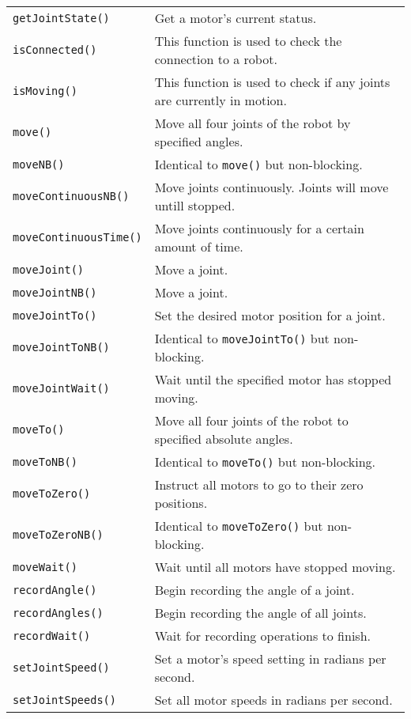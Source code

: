 \begin{table}[!h]
\begin{center}
\begin{tabular}{p{38 mm}p{110 mm}}
\texttt{getJointState()} & Get a motor's current status. \\
\texttt{isConnected()} & This function is used to check the connection to a robot. \\
\texttt{isMoving()} & This function is used to check if any joints are currently in motion. \\
\texttt{move()} & Move all four joints of the robot by specified angles. \\
\texttt{moveNB()} & Identical to \texttt{move()} but non-blocking. \\
\texttt{moveContinuousNB()} & Move joints continuously. Joints will move untill stopped.\\
\texttt{moveContinuousTime()} & Move joints continuously for a certain amount of time.\\
\texttt{moveJoint()} & Move a joint. \\
\texttt{moveJointNB()} & Move a joint. \\
\texttt{moveJointTo()} & Set the desired motor position for a joint. \\
\texttt{moveJointToNB()} & Identical to \texttt{moveJointTo()} but non-blocking. \\
\texttt{moveJointWait()} & Wait until the specified motor has stopped moving. \\
\texttt{moveTo()} & Move all four joints of the robot to specified absolute angles. \\
\texttt{moveToNB()} & Identical to \texttt{moveTo()} but non-blocking. \\
\texttt{moveToZero()} & Instruct all motors to go to their zero positions. \\
\texttt{moveToZeroNB()} & Identical to \texttt{moveToZero()} but non-blocking. \\
\texttt{moveWait()} & Wait until all motors have stopped moving. \\
\texttt{recordAngle()} & Begin recording the angle of a joint. \\
\texttt{recordAngles()} & Begin recording the angle of all joints. \\
\texttt{recordWait()} & Wait for recording operations to finish. \\
\texttt{setJointSpeed()} & Set a motor's speed setting in radians per second. \\
\texttt{setJointSpeeds()} & Set all motor speeds in radians per second. \\

\end{tabular}
\end{center}
\end{table}
